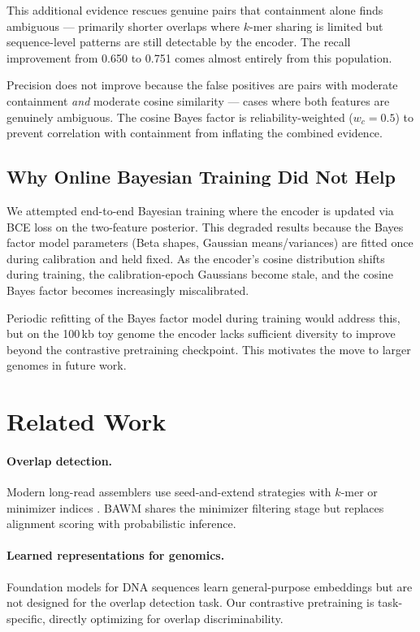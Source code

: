 \documentclass[11pt,a4paper]{article}
\begin{document}
This additional evidence rescues genuine pairs that containment alone
finds ambiguous --- primarily shorter overlaps where $k$-mer sharing is
limited but sequence-level patterns are still detectable by the
encoder.  The recall improvement from 0.650 to 0.751 comes almost
entirely from this population.

Precision does not improve because the false positives are pairs with
moderate containment \emph{and} moderate cosine similarity --- cases
where both features are genuinely ambiguous.  The cosine Bayes factor
is reliability-weighted ($w_c = 0.5$) to prevent correlation with
containment from inflating the combined evidence.

\subsection{Why Online Bayesian Training Did Not Help}

We attempted end-to-end Bayesian training where the encoder is updated
via BCE loss on the two-feature posterior.  This degraded results
because the Bayes factor model parameters (Beta shapes, Gaussian
means/variances) are fitted once during calibration and held fixed.
As the encoder's cosine distribution shifts during training, the
calibration-epoch Gaussians become stale, and the cosine Bayes factor
becomes increasingly miscalibrated.

Periodic refitting of the Bayes factor model during training would
address this, but on the 100\,kb toy genome the encoder lacks
sufficient diversity to improve beyond the contrastive pretraining
checkpoint.  This motivates the move to larger genomes in future work.


\section{Related Work}
\label{sec:related}

\paragraph{Overlap detection.}
Modern long-read assemblers use seed-and-extend strategies with
$k$-mer or minimizer indices \citep{li2016minimap2,
cheng2021hifiasm}.  BAWM shares the minimizer filtering stage but
replaces alignment scoring with probabilistic inference.

\paragraph{Learned representations for genomics.}
Foundation models for DNA sequences \citep{ji2021dnabert,
dalla2023nucleotide} learn general-purpose embeddings but are not
designed for the overlap detection task.  Our contrastive pretraining
is task-specific, directly optimizing for overlap discriminability.
\end{document}

